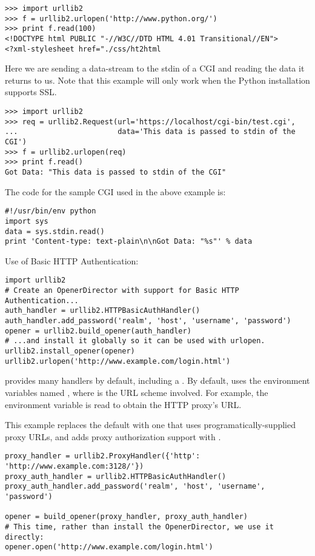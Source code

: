 \begin{verbatim}
>>> import urllib2
>>> f = urllib2.urlopen('http://www.python.org/')
>>> print f.read(100)
<!DOCTYPE html PUBLIC "-//W3C//DTD HTML 4.01 Transitional//EN">
<?xml-stylesheet href="./css/ht2html
\end{verbatim}

Here we are sending a data-stream to the stdin of a CGI and reading
the data it returns to us. Note that this example will only work when the
Python installation supports SSL.

\begin{verbatim}
>>> import urllib2
>>> req = urllib2.Request(url='https://localhost/cgi-bin/test.cgi',
...                       data='This data is passed to stdin of the CGI')
>>> f = urllib2.urlopen(req)
>>> print f.read()
Got Data: "This data is passed to stdin of the CGI"
\end{verbatim}

The code for the sample CGI used in the above example is:

\begin{verbatim}
#!/usr/bin/env python
import sys
data = sys.stdin.read()
print 'Content-type: text-plain\n\nGot Data: "%s"' % data
\end{verbatim}


Use of Basic HTTP Authentication:

\begin{verbatim}
import urllib2
# Create an OpenerDirector with support for Basic HTTP Authentication...
auth_handler = urllib2.HTTPBasicAuthHandler()
auth_handler.add_password('realm', 'host', 'username', 'password')
opener = urllib2.build_opener(auth_handler)
# ...and install it globally so it can be used with urlopen.
urllib2.install_opener(opener)
urllib2.urlopen('http://www.example.com/login.html')
\end{verbatim}

 provides many handlers by default, including a
.  By default,  uses the
environment variables named , where 
is the URL scheme involved.  For example, the 
environment variable is read to obtain the HTTP proxy's URL.

This example replaces the default  with one that uses
programatically-supplied proxy URLs, and adds proxy authorization support
with .

\begin{verbatim}
proxy_handler = urllib2.ProxyHandler({'http': 'http://www.example.com:3128/'})
proxy_auth_handler = urllib2.HTTPBasicAuthHandler()
proxy_auth_handler.add_password('realm', 'host', 'username', 'password')

opener = build_opener(proxy_handler, proxy_auth_handler)
# This time, rather than install the OpenerDirector, we use it directly:
opener.open('http://www.example.com/login.html')
\end{verbatim}


